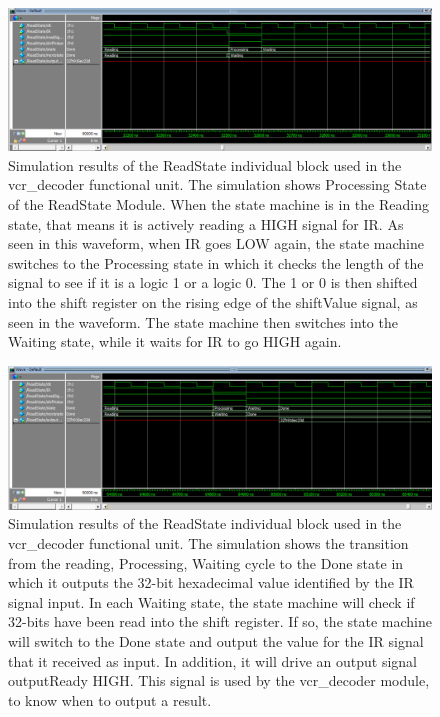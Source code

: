 \documentclass[a4paper]{article}
\begin{document}
\begin{figure}[h]
  \centering
  \includegraphics[width=.98\textwidth]{sims/vcr_testing/moduleTests/ReadState/PROCESSING_State.png}
  \caption{Simulation results of the ReadState individual block used in the vcr\_decoder functional unit. The simulation shows Processing State of the ReadState Module. When the state machine is in the Reading state, that means it is actively reading a HIGH signal for IR. As seen in this waveform, when IR goes LOW again, the state machine switches to the Processing state in which it checks the length of the signal to see if it is a logic 1 or a logic 0. The 1 or 0 is then shifted into the shift register on the rising edge of the shiftValue signal, as seen in the waveform. The state machine then switches into the Waiting state, while it waits for IR to go HIGH again.}
    \label{fig:individual-1-2-sim}
\end{figure}
\begin{figure}[h]
  \centering
  \includegraphics[width=.98\textwidth]{sims/vcr_testing/moduleTests/ReadState/Transition_to_DONE.png}
  \caption{Simulation results of the ReadState individual block used in the vcr\_decoder functional unit. The simulation shows the transition from the reading, Processing, Waiting cycle to the Done state in which it outputs the 32-bit hexadecimal value identified by the IR signal input. In each Waiting state, the state machine will check if 32-bits have been read into the shift register. If so, the state machine will switch to the Done state and output the value for the IR signal that it received as input. In addition, it will drive an output signal outputReady HIGH. This signal is used by the vcr\_decoder module, to know when to output a result.}
    \label{fig:individual-1-2-sim}
\end{figure}
\clearpage
\end{document}
